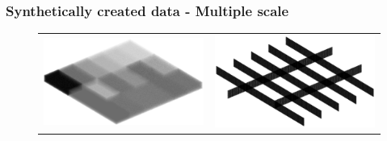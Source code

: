 \documentclass[9pt]{beamer}
\begin{document}
\begin{frame}
\frametitle{Synthetically created data - Multiple scale}
\begin{figure}
\begin{tabular}{cc}

\includegraphics[scale=0.3]{multi.eps} & \includegraphics[scale=0.3]{multiideal.eps}

\end{tabular}
\end{figure}
\end{frame}	
	
\end{document}
